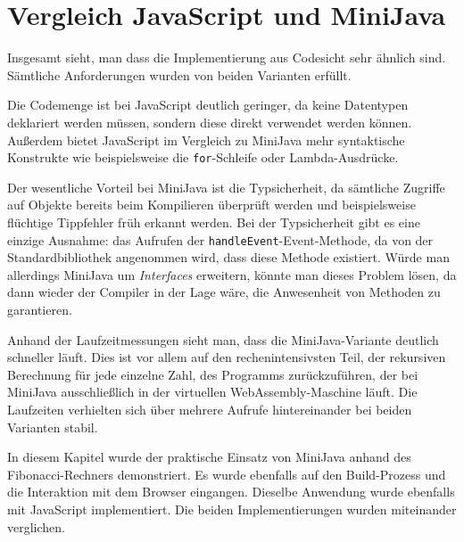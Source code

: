 \section{Vergleich JavaScript und MiniJava}

Insgesamt sieht, man dass die Implementierung aus Codesicht sehr ähnlich sind. Sämtliche Anforderungen wurden von beiden Varianten erfüllt.

Die Codemenge ist bei JavaScript deutlich geringer, da keine Datentypen deklariert werden müssen, sondern diese direkt verwendet werden können. Außerdem bietet JavaScript im Vergleich zu MiniJava mehr syntaktische Konstrukte wie beispielsweise die \lstinline{for}-Schleife oder Lambda-Ausdrücke. 

Der wesentliche Vorteil bei MiniJava ist die Typsicherheit, da sämtliche Zugriffe auf Objekte bereits beim Kompilieren überprüft werden und beispielsweise flüchtige Tippfehler früh erkannt werden. Bei der Typsicherheit gibt es eine einzige Ausnahme: das Aufrufen der \lstinline{handleEvent}-Event-Methode, da von der Standardbibliothek angenommen wird, dass diese Methode existiert. Würde man allerdings MiniJava um \emph{Interfaces} erweitern, könnte man dieses Problem lösen, da dann wieder der Compiler in der Lage wäre, die Anwesenheit von Methoden zu garantieren.

Anhand der Laufzeitmessungen sieht man, dass die MiniJava-Variante deutlich schneller läuft. Dies ist vor allem auf den rechenintensivsten Teil, der rekursiven Berechnung für jede einzelne Zahl, des Programms zurückzuführen, der bei MiniJava ausschließlich in der virtuellen WebAssembly-Maschine läuft. Die Laufzeiten verhielten sich über mehrere Aufrufe hintereinander bei beiden Varianten stabil.

\vspace{4em}
In diesem Kapitel wurde der praktische Einsatz von MiniJava anhand des Fibonacci-Rechners demonstriert. Es wurde ebenfalls auf den Build-Prozess und die Interaktion mit dem Browser eingangen. Dieselbe Anwendung wurde ebenfalls mit JavaScript implementiert. Die beiden Implementierungen wurden miteinander verglichen.
